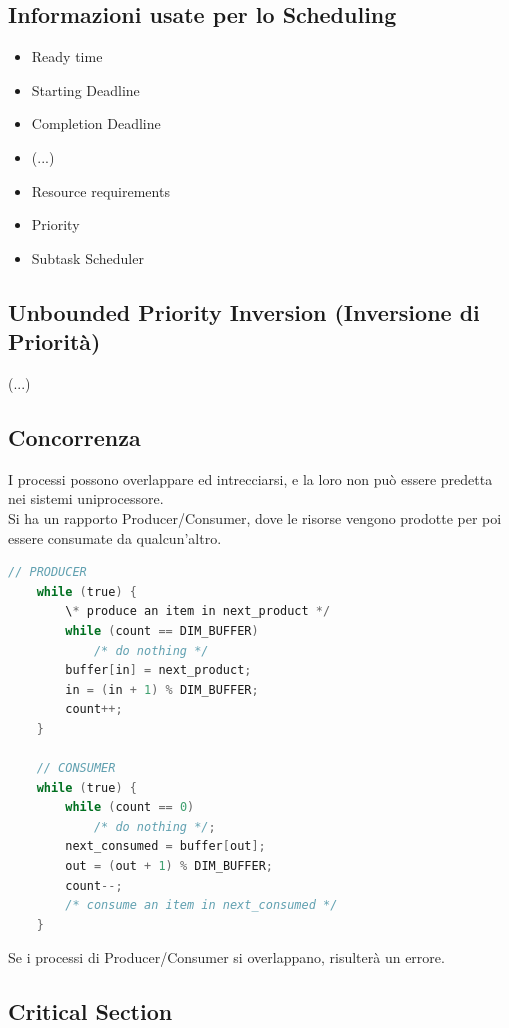 \documentclass[12pt, a4paper]{article}
\begin{document}
	\subsection*{Informazioni usate per lo Scheduling}
	\begin{itemize}
		\item Ready time
		\item Starting Deadline
		\item Completion Deadline
		\item (...)
		\item Resource requirements
		\item Priority
		\item Subtask Scheduler
	\end{itemize}
	
	
	\subsection*{Unbounded Priority Inversion (Inversione di Priorità)}
	
	(...)
	\\
	
	
	\subsection*{Concorrenza}
	I processi possono overlappare ed intrecciarsi, e la loro  non può essere predetta nei sistemi uniprocessore.
	\\
	Si ha un rapporto Producer/Consumer, dove le risorse vengono prodotte per poi essere consumate da qualcun'altro.
	
	\begin{lstlisting}[language=C]
	// PRODUCER
	while (true) {
		\* produce an item in next_product */
		while (count == DIM_BUFFER)
			/* do nothing */
		buffer[in] = next_product;
		in = (in + 1) % DIM_BUFFER;
		count++;
	}

	// CONSUMER
	while (true) {
		while (count == 0)
			/* do nothing */;
		next_consumed = buffer[out];
		out = (out + 1) % DIM_BUFFER;
		count--;
		/* consume an item in next_consumed */
	}
	\end{lstlisting}

	Se i processi di Producer/Consumer si overlappano, risulterà un errore.
	
	
	\subsection*{Critical Section}
	
\end{document}
